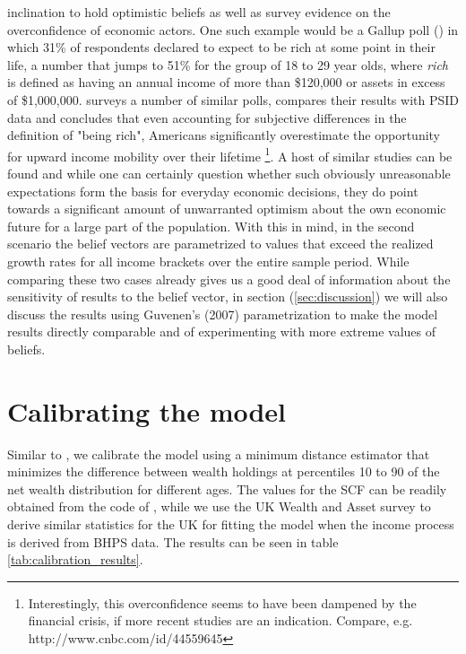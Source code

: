 inclination to hold optimistic beliefs as well as survey evidence on the 
overconfidence of economic actors. One such example would be a Gallup poll 
(\citealp{Moore2003}) in which 31\% of respondents declared to expect to be rich
 at some point in their life, a number that jumps to 51\% for the group of 18 to
 29 year olds, where \textit{rich} is defined as having an annual income of more
 than \$120,000 or assets in excess of \$1,000,000. \citet{DiPrete2007} surveys
 a number of similar polls, compares their results with PSID data and concludes 
that even accounting for subjective differences in the definition of "being rich",
 Americans significantly overestimate the opportunity for upward income mobility
 over their lifetime \footnote{Interestingly, this overconfidence seems to have 
been dampened by the financial crisis, if more recent studies are an indication.
 Compare, e.g. http://www.cnbc.com/id/44559645}. A host of similar studies can 
be found and while one can certainly question whether such obviously unreasonable 
expectations form the basis for everyday economic decisions, they do point towards
 a significant amount of unwarranted optimism about the own economic future for 
a large part of the population. With this in mind, in the second scenario the 
belief vectors are parametrized to values that exceed the realized growth rates
 for all income brackets over the entire sample period. While comparing these 
two cases already gives us a good deal of information about the sensitivity of 
results to the belief vector, in section (\ref{sec:discussion}) we will also discuss 
the results using Guvenen's (2007) parametrization to make the model results 
directly comparable and of experimenting with more extreme values of beliefs. 

\section{Calibrating the model}\label{sec:calibration}
Similar to \citet{HintermaierKoeniger2011}, we calibrate the model using a minimum 
distance estimator that minimizes the difference between wealth holdings at percentiles 
10 to 90 of the net wealth distribution for different ages. The values for the 
SCF can be readily obtained from the code of \citet{HintermaierKoeniger2011}, 
while we use the UK Wealth and Asset survey to derive similar statistics for the 
UK for fitting the model when the income process is derived from BHPS data.
The results can be seen in table \ref{tab:calibration_results}.

